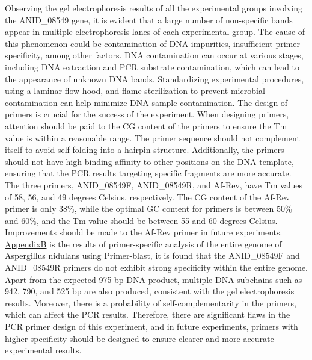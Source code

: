 \documentclass[a4paper,10pt]{article}
\begin{document}
\begin{multicols}{2}
Observing the gel electrophoresis results of all the experimental groups involving the ANID\_08549 gene, it is evident that a large number of non-specific bands appear in multiple electrophoresis lanes of each experimental group. The cause of this phenomenon could be contamination of DNA impurities, insufficient primer specificity, among other factors. DNA contamination can occur at various stages, including DNA extraction and PCR substrate contamination, which can lead to the appearance of unknown DNA bands. Standardizing experimental procedures, using a laminar flow hood, and flame sterilization to prevent microbial contamination can help minimize DNA sample contamination. The design of primers is crucial for the success of the experiment. When designing primers, attention should be paid to the CG content of the primers to ensure the Tm value is within a reasonable range. The primer sequence should not complement itself to avoid self-folding into a hairpin structure\cite{singh2000effect}. Additionally, the primers should not have high binding affinity to other positions on the DNA template, ensuring that the PCR results targeting specific fragments are more accurate. The three primers, ANID\_08549F, ANID\_08549R, and Af-Rev, have Tm values of 58, 56, and 49 degrees Celsius, respectively. The CG content of the Af-Rev primer is only 38\%, while the optimal GC content for primers is between 50\% and 60\%, and the Tm value should be between 55 and 60 degrees Celsius. Improvements should be made to the Af-Rev primer in future experiments. \hyperref[secB]{AppendixB} is the results of primer-specific analysis of the entire genome of Aspergillus nidulans using Primer-blast, it is found that the ANID\_08549F and ANID\_08549R primers do not exhibit strong specificity within the entire genome. Apart from the expected 975 bp DNA product, multiple DNA subchains such as 942, 790, and 525 bp are also produced, consistent with the gel electrophoresis results. Moreover, there is a probability of self-complementarity in the primers, which can affect the PCR results. Therefore, there are significant flaws in the PCR primer design of this experiment, and in future experiments, primers with higher specificity should be designed to ensure clearer and more accurate experimental results.



\end{multicols}
\end{document}
